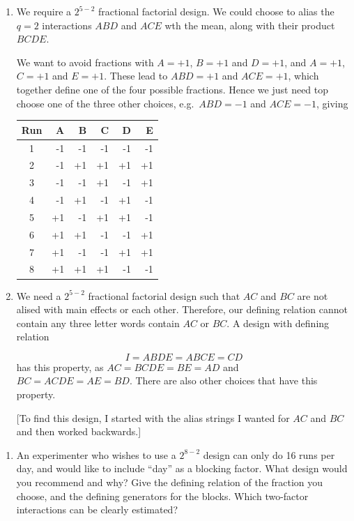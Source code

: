 \documentclass[
]{book}
\providecommand{\tightlist}{%
  \setlength{\itemsep}{0pt}\setlength{\parskip}{0pt}}
\theoremstyle{definition}
\theoremstyle{definition}
\theoremstyle{definition}
\theoremstyle{definition}
\theoremstyle{remark}
\begin{document}
\begin{enumerate}
\def\labelenumi{\alph{enumi}.}
\item
  We require a \(2^{5-2}\) fractional factorial design. We could choose to alias the \(q=2\) interactions \(ABD\) and \(ACE\) wth the mean, along with their product \(BCDE\).

  We want to avoid fractions with \(A = +1\), \(B = +1\) and \(D = +1\), and \(A = +1\), \(C = +1\) and \(E = +1\). These lead to \(ABD = +1\) and \(ACE = +1\), which together define one of the four possible fractions. Hence we just need top choose one of the three other choices, e.g.~\(ABD = -1\) and \(ACE = -1\), giving

  \begin{longtable}[]{@{}crrrrr@{}}
  \toprule()
  Run & A & B & C & D & E \\
  \midrule()
  \endhead
  1 & -1 & -1 & -1 & -1 & -1 \\
  2 & -1 & +1 & +1 & +1 & +1 \\
  3 & -1 & -1 & +1 & -1 & +1 \\
  4 & -1 & +1 & -1 & +1 & -1 \\
  5 & +1 & -1 & +1 & +1 & -1 \\
  6 & +1 & +1 & -1 & -1 & +1 \\
  7 & +1 & -1 & -1 & +1 & +1 \\
  8 & +1 & +1 & +1 & -1 & -1 \\
  \bottomrule()
  \end{longtable}
\item
  We need a \(2^{5-2}\) fractional factorial design such that \(AC\) and \(BC\) are not alised with main effects or each other. Therefore, our defining relation cannot contain any three letter words contain \(AC\) or \(BC\). A design with defining relation

  \[
   I = ABDE = ABCE = CD
   \]
  has this property, as \(AC = BCDE = BE = AD\) and \(BC = ACDE = AE = BD\). There are also other choices that have this property.

  {[}To find this design, I started with the alias strings I wanted for \(AC\) and \(BC\) and then worked backwards.{]}
\end{enumerate}

\begin{enumerate}
\def\labelenumi{\arabic{enumi}.}
\setcounter{enumi}{3}
\tightlist
\item
  An experimenter who wishes to use a \(2^{8-2}\) design can only do 16 runs per day, and would like to include ``day'' as a blocking factor. What design would you recommend and why? Give the defining relation of the fraction you choose, and the defining generators for the blocks. Which two-factor interactions can be clearly estimated?
\end{enumerate}
\end{document}

